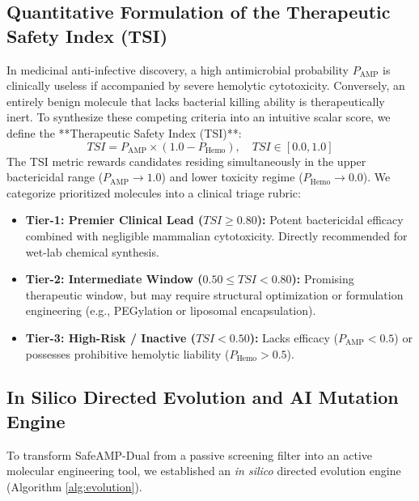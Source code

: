 \documentclass[11pt,a4paper]{article}
\begin{document}
\subsection{Quantitative Formulation of the Therapeutic Safety Index (TSI)}
In medicinal anti-infective discovery, a high antimicrobial probability $P_{\text{AMP}}$ is clinically useless if accompanied by severe hemolytic cytotoxicity. Conversely, an entirely benign molecule that lacks bacterial killing ability is therapeutically inert. To synthesize these competing criteria into an intuitive scalar score, we define the **Therapeutic Safety Index (TSI)**:
\begin{equation}
    TSI = P_{\text{AMP}} \times (1.0 - P_{\text{Hemo}}), \quad TSI \in [0.0, 1.0]
\end{equation}
The TSI metric rewards candidates residing simultaneously in the upper bactericidal range ($P_{\text{AMP}} \to 1.0$) and lower toxicity regime ($P_{\text{Hemo}} \to 0.0$). We categorize prioritized molecules into a clinical triage rubric:
\begin{itemize}
    \item \textbf{Tier-1: Premier Clinical Lead ($TSI \ge 0.80$):} Potent bactericidal efficacy combined with negligible mammalian cytotoxicity. Directly recommended for wet-lab chemical synthesis.
    \item \textbf{Tier-2: Intermediate Window ($0.50 \le TSI < 0.80$):} Promising therapeutic window, but may require structural optimization or formulation engineering (e.g., PEGylation or liposomal encapsulation).
    \item \textbf{Tier-3: High-Risk / Inactive ($TSI < 0.50$):} Lacks efficacy ($P_{\text{AMP}} < 0.5$) or possesses prohibitive hemolytic liability ($P_{\text{Hemo}} > 0.5$).
\end{itemize}

\subsection{In Silico Directed Evolution and AI Mutation Engine}
To transform SafeAMP-Dual from a passive screening filter into an active molecular engineering tool, we established an \textit{in silico} directed evolution engine (Algorithm \ref{alg:evolution}). 
\end{document}
